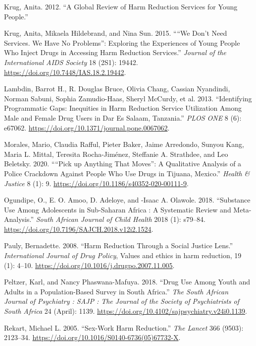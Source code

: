 \documentclass[
  letterpaper,
  DIV=11,
  numbers=noendperiod]{scrartcl}
\newlength{\cslhangindent}
\newenvironment{CSLReferences}[2] %
 {\begin{list}{}{%
  \setlength{\itemindent}{0pt}
  \setlength{\leftmargin}{0pt}
  \setlength{\parsep}{0pt}
  \ifodd #1
   \setlength{\leftmargin}{\cslhangindent}
   \setlength{\itemindent}{-1\cslhangindent}
  \fi
  \setlength{\itemsep}{#2\baselineskip}}}
 {\end{list}}
\begin{document}
\begin{CSLReferences}{1}{0}
Krug, Anita. 2012. {``A Global Review of Harm Reduction Services for
Young People.''}

Krug, Anita, Mikaela Hildebrand, and Nina Sun. 2015. {``{``}We Don't
Need Services. We Have No Problems{''}: Exploring the Experiences of
Young People Who Inject Drugs in Accessing Harm Reduction Services.''}
\emph{Journal of the International AIDS Society} 18 (2S1): 19442.
\url{https://doi.org/10.7448/IAS.18.2.19442}.

Lambdin, Barrot H., R. Douglas Bruce, Olivia Chang, Cassian Nyandindi,
Norman Sabuni, Sophia Zamudio-Haas, Sheryl McCurdy, et al. 2013.
{``Identifying Programmatic Gaps: Inequities in Harm Reduction Service
Utilization Among Male and Female Drug Users in Dar Es Salaam,
Tanzania.''} \emph{PLOS ONE} 8 (6): e67062.
\url{https://doi.org/10.1371/journal.pone.0067062}.

Morales, Mario, Claudia Rafful, Pieter Baker, Jaime Arredondo, Sunyou
Kang, Maria L. Mittal, Teresita Rocha-Jiménez, Steffanie A. Strathdee,
and Leo Beletsky. 2020. {``{``}Pick up Anything That Moves{''}: A
Qualitative Analysis of a Police Crackdown Against People Who Use Drugs
in Tijuana, Mexico.''} \emph{Health \& Justice} 8 (1): 9.
\url{https://doi.org/10.1186/s40352-020-00111-9}.

Ogundipe, O., E. O. Amoo, D. Adeloye, and -Isaac A. Olawole. 2018.
{``Substance Use Among Adolescents in Sub-Saharan Africa : A Systematic
Review and Meta-Analysis.''} \emph{South African Journal of Child
Health} 2018 (1): s79--84.
\url{https://doi.org/10.7196/SAJCH.2018.v12i2.1524}.

Pauly, Bernadette. 2008. {``Harm Reduction Through a Social Justice
Lens.''} \emph{International Journal of Drug Policy}, Values and ethics
in harm reduction, 19 (1): 4--10.
\url{https://doi.org/10.1016/j.drugpo.2007.11.005}.

Peltzer, Karl, and Nancy Phaswana-Mafuya. 2018. {``Drug Use Among Youth
and Adults in a Population-Based Survey in South Africa.''} \emph{The
South African Journal of Psychiatry : SAJP : The Journal of the Society
of Psychiatrists of South Africa} 24 (April): 1139.
\url{https://doi.org/10.4102/sajpsychiatry.v24i0.1139}.

Rekart, Michael L. 2005. {``Sex-Work Harm Reduction.''} \emph{The
Lancet} 366 (9503): 2123--34.
\url{https://doi.org/10.1016/S0140-6736(05)67732-X}.


\end{CSLReferences}
\end{document}
